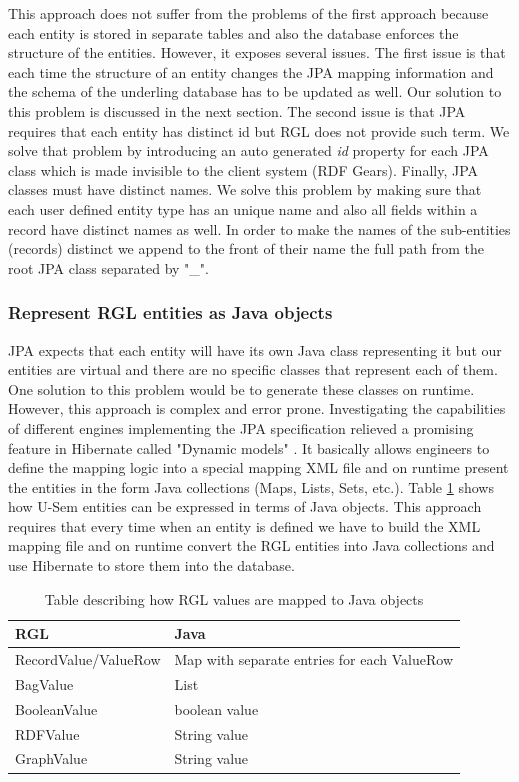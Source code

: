 This approach does not suffer from the problems of the first approach because each entity is stored in separate tables and also the database enforces the structure of the entities. However, it exposes several issues. The first issue is that each time the structure of an entity changes the JPA mapping information and the schema of the underling database has to be updated as well. Our solution to this problem is discussed in the next section. The second issue is that JPA requires that each entity has distinct id but RGL does not provide such term. We solve that problem by introducing an auto generated \textit{id} property for each JPA class which is made invisible to the client system (RDF Gears). Finally, JPA classes must have distinct names. We solve this problem by making sure that each user defined entity type has an unique name and also all fields within a record have distinct names as well. In order to make the names of the sub-entities (records) distinct we append to the front of their name the full path from the root JPA class separated by "\_".


\subsubsection{Represent RGL entities as Java objects}

JPA expects that each entity will have its own Java class representing it but our entities are virtual and there are no specific  classes that represent each of them. One solution to this problem would be to generate these classes on runtime. However, this approach is complex and error prone. Investigating the capabilities of different engines implementing the JPA specification relieved a promising feature in Hibernate called "Dynamic models" \cite{king2010hibernate}. It basically allows engineers to define the mapping logic into a special mapping XML file and on runtime present the entities in the form Java collections (Maps, Lists, Sets, etc.). Table \ref{tbl:rgl2java} shows how U-Sem entities can be expressed in terms of Java objects. This approach requires that every time when an entity is defined we have to build the XML mapping file and on runtime convert the RGL entities into Java collections and use Hibernate to store them into the database.

\begin{table}[h]
    \begin{tabular}{ | l | l |}
    \hline
    \textbf{RGL} & \textbf{Java}  \\ \hline
    RecordValue/ValueRow & Map with separate entries for each ValueRow \\ \hline
    BagValue & List  \\ \hline
    BooleanValue & boolean value  \\ \hline
    RDFValue & String value  \\ \hline
	GraphValue & String  value \\ \hline

    \end{tabular}
     \caption{Table describing how RGL values are mapped to Java objects}
    \label{tbl:rgl2java}
\end{table}
 
